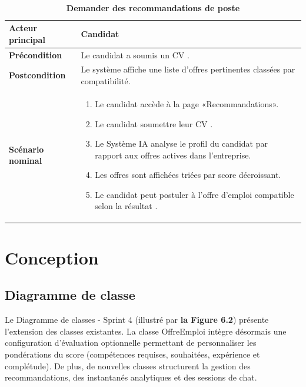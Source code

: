 \documentclass[12pt,a4paper,oneside]{report}
\begin{document}
\begin{itemize}
\begin{table}[H]
\centering
\caption{\textbf{Demander des recommandations de poste}} \\
\vspace{0.3cm}
\begin{tabular}{|p{3.5cm}|p{11cm}|}
\hline
\textbf{Acteur principal} & Candidat \\
\hline
\textbf{Précondition} & Le candidat a soumis un CV . \\
\hline
\textbf{Postcondition} & Le système affiche une liste d’offres pertinentes classées par compatibilité. \\
\hline
\textbf{Scénario nominal} &
\begin{minipage}[t]{10.5cm}
\begin{enumerate}
    \item Le candidat accède à la page «Recommandations».
    \item  Le candidat soumettre leur CV .
    \item Le Système IA analyse le profil du candidat par rapport aux offres actives dans l'entreprise.
    \item Les offres sont affichées triées par score décroissant.
    \item Le candidat peut postuler à l'offre d'emploi compatible selon la résultat .
    \vspace{0.3cm}
\end{enumerate}
\end{minipage} \\
\hline
\end{tabular}
\end{table}



\section{Conception}

\subsection{Diagramme de classe}
Le Diagramme de classes - Sprint 4 (illustré par \textbf{la Figure 6.2}) présente l'extension des classes existantes. La classe OffreEmploi intègre désormais une configuration d’évaluation optionnelle permettant de personnaliser les pondérations du score (compétences requises, souhaitées, expérience et complétude). De plus, de nouvelles classes structurent la gestion des recommandations, des instantanés analytiques et des sessions de chat.


\end{itemize}
\end{document}
